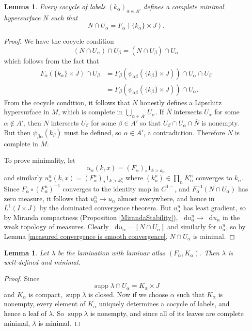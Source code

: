 \documentclass[reqno,11pt]{amsart}
\newcommand*\dif{\mathop{}\!\mathrm{d}}
\DeclareMathOperator{\supp}{supp}
\newtheorem{lemma}[theorem]{Lemma}
\theoremstyle{definition}
\numberwithin{equation}{section}
\begin{document}
\begin{lemma}
	Every cocycle of labels $(k_\alpha)_{\alpha \in A'}$ defines a complete minimal hypersurface $N$ such that
	$$N \cap U_\alpha = F_\alpha(\{k_\alpha\} \times J).$$
\end{lemma}
\begin{proof}
We have the cocycle condition
$$(N \cap U_\alpha) \cap U_\beta = (N \cap U_\beta) \cap U_\alpha$$
which follows from the fact that
\begin{align*}
F_\alpha(\{k_\alpha\} \times J) \cap U_\beta
&= F_\beta(\psi_{\alpha \beta}(\{k_\beta\} \times J)) \cap U_\alpha \cap U_\beta \\
&= F_\beta(\psi_{\alpha \beta}(\{k_\beta\} \times J)) \cap U_\alpha.
\end{align*}
From the cocycle condition, it follows that $N$ honestly defines a Lipschitz hypersurface in $M$, which is complete in $\bigcup_{\alpha \in A'} U_\alpha$.
If $\overline N$ intersects $U_\alpha$ for some $\alpha \notin A'$, then $N$ intersects $U_\beta$ for some $\beta \in A'$ so that $U_\beta \cap U_\alpha \cap \overline N$ is nonempty.
But then $\psi_{\beta \alpha}(k_\beta)$ must be defined, so $\alpha \in A'$, a contradiction.
Therefore $N$ is complete in $M$.

To prove minimality, let
$$u_\alpha(k, x) = (F_\alpha)_* 1_{k > k_\alpha}$$
and similarly $u_\alpha^n(k, x) = (F_\alpha^n)_* 1_{k > k_\alpha^n}$ where $(k_\alpha^n) \in \prod_n K_\alpha^n$ converges to $k_\alpha$.
Since $F_\alpha \circ (F_\alpha^n)^{-1}$ converges to the identity map in $C^{1-}$, and $F_\alpha^{-1}(N \cap U_\alpha)$ has zero measure, it follows that $u_\alpha^n \to u_\alpha$ almost everywhere, and hence in $L^1(I \times J)$ by the dominated convergence theorem.
But $u_\alpha^n$ has least gradient, so by Miranda compactness (Proposition \ref{MirandaStability}), $\dif u_\alpha^n \to \dif u_\alpha$ in the weak topology of measures.
Clearly $\dif u_\alpha = [N \cap U_\alpha]$ and similarly for $u_\alpha^n$, so by Lemma \ref{measured convergence is smooth convergence}, $N \cap U_\alpha$ is minimal.
\end{proof}

\begin{lemma}
	Let $\lambda$ be the lamination with laminar atlas $(F_\alpha, K_\alpha)$.
	Then $\lambda$ is well-defined and minimal.
\end{lemma}
\begin{proof}
Since 
$$\supp \lambda \cap U_\alpha = K_\alpha \times J$$
and $K_\alpha$ is compact, $\supp \lambda$ is closed.
Now if we choose $\alpha$ such that $K_\alpha$ is nonempty, every element of $K_\alpha$ uniquely determines a cocycle of labels, and hence a leaf of $\lambda$.
So $\supp \lambda$ is nonempty, and since all of its leaves are complete minimal, $\lambda$ is minimal.
\end{proof}
\end{document}

